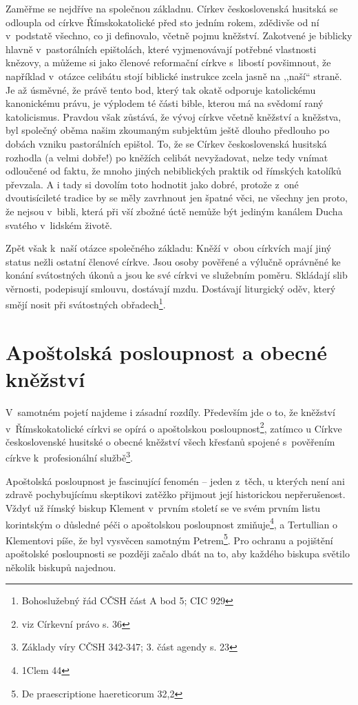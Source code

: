 Zaměřme se nejdříve na společnou základnu. Církev československá husitská se
odloupla od církve Římskokatolické před sto jedním rokem, zdědivše od ní
v~podstatě všechno, co ji definovalo, včetně pojmu kněžství. Zakotvené je
biblicky hlavně v~pastorálních epištolách, které vyjmenovávají potřebné
vlastnosti knězovy, a můžeme si jako členové reformační církve s~libostí
povšimnout, že například v~otázce celibátu stojí biblické instrukce zcela jasně
na ,,naší`` straně. Je až úsměvné, že právě tento bod, který tak okatě odporuje
katolickému kanonickému právu, je výplodem té části bible, kterou má na svědomí
raný katolicismus. Pravdou však zůstává, že vývoj církve včetně kněžství a
kněžstva, byl společný oběma našim zkoumaným subjektům ještě dlouho předlouho po
dobách vzniku pastorálních epištol. To, že se Církev československá husitská
rozhodla (a velmi dobře!) po kněžích celibát nevyžadovat, nelze tedy vnímat
odloučené od faktu, že mnoho jiných nebiblických praktik od římských katolíků
převzala. A i tady si dovolím toto hodnotit jako dobré, protože z~oné
dvoutisícileté tradice by se měly zavrhnout jen špatné věci, ne všechny jen
proto, že nejsou v~bibli, která při vší zbožné úctě nemůže být jediným kanálem
Ducha svatého v~lidském životě.

Zpět však k~naší otázce společného základu: Kněží v~obou
církvích mají jiný status nežli ostatní členové církve. Jsou osoby pověřené a
výlučně oprávněné ke konání svátostných úkonů a jsou ke své církvi ve služebním
poměru. Skládají slib věrnosti, podepisují smlouvu, dostávají mzdu. Dostávají
liturgický oděv, který smějí nosit při svátostných
obřadech\footnote{Bohoslužebný řád CČSH část A bod 5; CIC 929}.

\section{Apoštolská posloupnost a obecné kněžství}
V~samotném pojetí najdeme i zásadní rozdíly. Především jde o to, že kněžství
v~Římskokatolické církvi se opírá o apoštolskou posloupnost\footnote{viz
Církevní právo s. 36}, zatímco u Církve
československé husitské o obecné kněžství všech křesťanů spojené s~pověřením
církve k~profesionální službě\footnote{Základy víry CČSH 342-347; 3. část agendy
s. 23}.

Apoštolská posloupnost je fascinující fenomén --
jeden z~těch, u kterých není ani zdravě pochybujícímu skeptikovi zatěžko
přijmout její historickou nepřerušenost. Vždyť už římský biskup Klement v~prvním
století se ve svém prvním listu korintským o důsledné péči o apoštolskou
posloupnost zmiňuje\footnote{1Clem 44}, a Tertullian o Klementovi píše, že byl
vysvěcen samotným Petrem\footnote{De praescriptione haereticorum 32,2}. Pro
ochranu a pojištění apoštolské posloupnosti se později začalo dbát na to, aby
každého biskupa světilo několik biskupů najednou.

